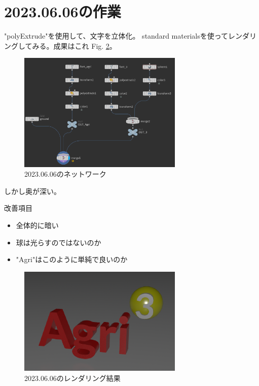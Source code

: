 \documentclass[uplatex,dvipdfmx]{jsarticle}
\begin{document}
\section{2023.06.06の作業}
"polyExtrude"を使用して、文字を立体化。
standard materialsを使ってレンダリングしてみる。成果はこれ Fig. \ref{fig:rendered_230606}。


\begin{figure}[h]
  \centering
  \includegraphics[width=0.7\textwidth]{figs/network_230606.PNG}
  \caption{2023.06.06のネットワーク}
  \label{fig:network_230606}
\end{figure}

しかし奥が深い。

\bigskip
改善項目
\begin{itemize}
  \item 全体的に暗い
  \item 球は光らすのではないのか
  \item "Agri"はこのように単純で良いのか
\end{itemize}

\begin{figure}[h]
  \centering
  \includegraphics[width=0.7\textwidth]{figs/logo_230606.PNG}
  \caption{2023.06.06のレンダリング結果}
  \label{fig:rendered_230606}
\end{figure}
\end{document}
